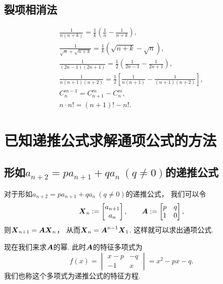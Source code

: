 \subsection{裂项相消法}
\begin{gather}
	\frac1{n(n+k)}
	= \frac1k \left( \frac1n - \frac1{n+k} \right), \\
	\frac1{\sqrt{n}+\sqrt{n+k}}
	= \frac1k \left( \sqrt{n+k} - \sqrt{n} \right), \\
	\frac1{(2n-1)(2n+1)}
	= \frac12 \left( \frac1{2n-1} - \frac1{2n+1} \right), \\
	\frac1{n(n+1)(n+2)}
	= \frac12 \left[ \frac1{n(n+1)} - \frac1{(n+1)(n+2)} \right], \\
	C_n^{m-1} = C_{n+1}^m - C_n^m, \\
	n \cdot n! = (n+1)! - n!.
\end{gather}

\section{已知递推公式求解通项公式的方法}
\subsection{\texorpdfstring{形如\(a_{n+2}=p a_{n+1} + q a_n\ (q\neq0)\)的递推公式}{第一类递推公式}}
对于形如\(a_{n+2}=p a_{n+1} + q a_n\ (q\neq0)\)的递推公式，
我们可以令\begin{equation*}
	\boldsymbol{X}_n
	:= \begin{bmatrix}
		a_{n+1} \\
		a_n
	\end{bmatrix},
	\qquad
	\boldsymbol{A}
	:= \begin{bmatrix}
		p & q \\
		1 & 0
	\end{bmatrix},
\end{equation*}
则\(\boldsymbol{X}_{n+1} = \boldsymbol{A} \boldsymbol{X}_n\)，
从而\(\boldsymbol{X}_n = \boldsymbol{A}^{n-1} \boldsymbol{X}_1\).
这样就可以求出通项公式.

现在我们来求\(\boldsymbol{A}\)的幂.
此时\(\boldsymbol{A}\)的特征多项式为\begin{equation*}
	f(x)
	= \begin{vmatrix}
		x-p & -q \\
		-1 & x
	\end{vmatrix}
	= x^2 - px - q.
\end{equation*}
我们也称这个多项式为递推公式的特征方程.

